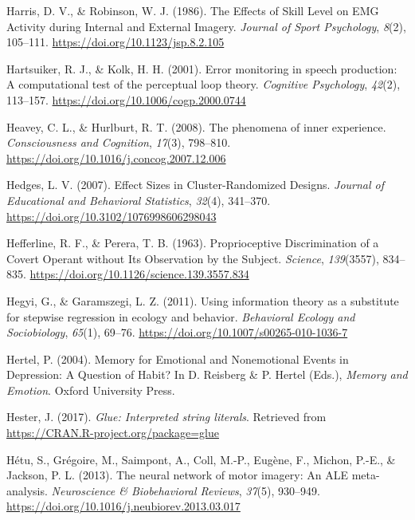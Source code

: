 \documentclass[a4paper,12pt,twoside,openright,oldfontcommands]{memoir}
\begin{document}
\leavevmode\hypertarget{ref-harris_effects_1986}{}%
Harris, D. V., \& Robinson, W. J. (1986). The Effects of Skill Level on EMG Activity during Internal and External Imagery. \emph{Journal of Sport Psychology}, \emph{8}(2), 105--111. \url{https://doi.org/10.1123/jsp.8.2.105}

\leavevmode\hypertarget{ref-hartsuiker_error_2001}{}%
Hartsuiker, R. J., \& Kolk, H. H. (2001). Error monitoring in speech production: A computational test of the perceptual loop theory. \emph{Cognitive Psychology}, \emph{42}(2), 113--157. \url{https://doi.org/10.1006/cogp.2000.0744}

\leavevmode\hypertarget{ref-heavey_phenomena_2008}{}%
Heavey, C. L., \& Hurlburt, R. T. (2008). The phenomena of inner experience. \emph{Consciousness and Cognition}, \emph{17}(3), 798--810. \url{https://doi.org/10.1016/j.concog.2007.12.006}

\leavevmode\hypertarget{ref-hedges_effect_2007}{}%
Hedges, L. V. (2007). Effect Sizes in Cluster-Randomized Designs. \emph{Journal of Educational and Behavioral Statistics}, \emph{32}(4), 341--370. \url{https://doi.org/10.3102/1076998606298043}

\leavevmode\hypertarget{ref-hefferline_proprioceptive_1963}{}%
Hefferline, R. F., \& Perera, T. B. (1963). Proprioceptive Discrimination of a Covert Operant without Its Observation by the Subject. \emph{Science}, \emph{139}(3557), 834--835. \url{https://doi.org/10.1126/science.139.3557.834}

\leavevmode\hypertarget{ref-hegyi_using_2011}{}%
Hegyi, G., \& Garamszegi, L. Z. (2011). Using information theory as a substitute for stepwise regression in ecology and behavior. \emph{Behavioral Ecology and Sociobiology}, \emph{65}(1), 69--76. \url{https://doi.org/10.1007/s00265-010-1036-7}

\leavevmode\hypertarget{ref-hertel_memory_2004}{}%
Hertel, P. (2004). Memory for Emotional and Nonemotional Events in Depression: A Question of Habit? In D. Reisberg \& P. Hertel (Eds.), \emph{Memory and Emotion}. Oxford University Press.

\leavevmode\hypertarget{ref-R-glue}{}%
Hester, J. (2017). \emph{Glue: Interpreted string literals}. Retrieved from \url{https://CRAN.R-project.org/package=glue}

\leavevmode\hypertarget{ref-hetu_neural_2013}{}%
Hétu, S., Grégoire, M., Saimpont, A., Coll, M.-P., Eugène, F., Michon, P.-E., \& Jackson, P. L. (2013). The neural network of motor imagery: An ALE meta-analysis. \emph{Neuroscience \& Biobehavioral Reviews}, \emph{37}(5), 930--949. \url{https://doi.org/10.1016/j.neubiorev.2013.03.017}
\end{document}
